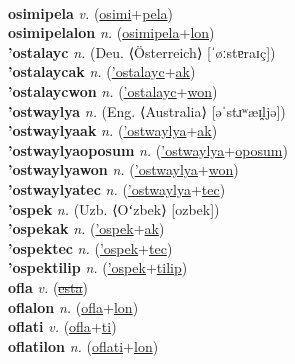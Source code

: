  \label{osimimotalon} \\
\textbf{osimipela} \textit{v.} (\hyperref[osimi]{osimi}+\hyperref[pela]{pela})
 \label{osimipela} \\
\textbf{osimipelalon} \textit{n.} (\hyperref[osimipela]{osimipela}+\hyperref[lon]{lon})
 \label{osimipelalon} \\
\textbf{'ostalayc} \textit{n.} (Deu. ⟨Österreich⟩ [ˈøːstɐraɪç])
 \label{'ostalayc} \\
\textbf{'ostalaycak} \textit{n.} (\hyperref['ostalayc]{'ostalayc}+\hyperref[ak]{ak})
 \label{'ostalaycak} \\
\textbf{'ostalaycwon} \textit{n.} (\hyperref['ostalayc]{'ostalayc}+\hyperref[won]{won})
 \label{'ostalaycwon} \\
\textbf{'ostwaylya} \textit{n.} (Eng. ⟨Australia⟩ [əˈstɹʷæɪ̯ljə])
 \label{'ostwaylya} \\
\textbf{'ostwaylyaak} \textit{n.} (\hyperref['ostwaylya]{'ostwaylya}+\hyperref[ak]{ak})
 \label{'ostwaylyaak} \\
\textbf{'ostwaylyaoposum} \textit{n.} (\hyperref['ostwaylya]{'ostwaylya}+\hyperref[oposum]{oposum})
 \label{'ostwaylyaoposum} \\
\textbf{'ostwaylyawon} \textit{n.} (\hyperref['ostwaylya]{'ostwaylya}+\hyperref[won]{won})
 \label{'ostwaylyawon} \\
\textbf{'ostwaylyatec} \textit{n.} (\hyperref['ostwaylya]{'ostwaylya}+\hyperref[tec]{tec})
 \label{'ostwaylyatec} \\
\textbf{'ospek} \textit{n.} (Uzb. ⟨Oʻzbek⟩ [ozbek])
 \label{'ospek} \\
\textbf{'ospekak} \textit{n.} (\hyperref['ospek]{'ospek}+\hyperref[ak]{ak})
 \label{'ospekak} \\
\textbf{'ospektec} \textit{n.} (\hyperref['ospek]{'ospek}+\hyperref[tec]{tec})
 \label{'ospektec} \\
\textbf{'ospektilip} \textit{n.} (\hyperref['ospek]{'ospek}+\hyperref[tilip]{tilip})
 \label{'ospektilip} \\
\textbf{ofla} \textit{v.} (\hyperref[esta]{\sout{esta}})
 \label{ofla} \\
\textbf{oflalon} \textit{n.} (\hyperref[ofla]{ofla}+\hyperref[lon]{lon})
 \label{oflalon} \\
\textbf{oflati} \textit{v.} (\hyperref[ofla]{ofla}+\hyperref[ti]{ti})
 \label{oflati} \\
\textbf{oflatilon} \textit{n.} (\hyperref[oflati]{oflati}+\hyperref[lon]{lon})
 \label{oflatilon} \\
